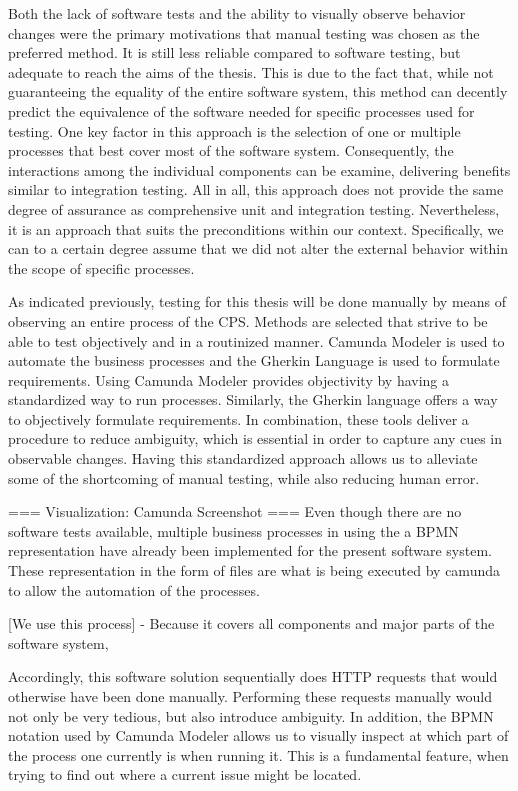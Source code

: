 Both the lack of software tests and the ability to visually observe behavior changes were the primary motivations that manual testing was chosen as the preferred method. It is still less reliable compared to software testing, but adequate to reach the aims of the thesis. This is due to the fact that, while not guaranteeing the equality of the entire software system, this method can decently predict the equivalence of the software needed for specific processes used for testing. One key factor in this approach is the selection of one or multiple processes that best cover most of the software system. Consequently, the interactions among the individual components can be examine, delivering benefits similar to integration testing. All in all, this approach does not provide the same degree of assurance as comprehensive unit and integration testing. Nevertheless, it is an approach that suits the preconditions within our context. Specifically, we can to a certain degree assume that we did not alter the external behavior within the scope of specific processes. 


As indicated previously, testing for this thesis will be done manually by means of observing an entire process of the CPS. Methods are selected that strive to be able to test objectively and in a routinized manner. Camunda Modeler is used to automate the business processes and the Gherkin Language is used to formulate requirements. Using Camunda Modeler provides objectivity by having a standardized way to run processes. Similarly, the Gherkin language offers a way to objectively formulate requirements. In combination, these tools deliver a procedure to reduce ambiguity, which is essential in order to capture any cues in observable changes. Having this standardized approach allows us to alleviate some of the shortcoming of manual testing, while also reducing human error.

=== Visualization: Camunda Screenshot ===
Even though there are no software tests available, multiple business processes in using the a BPMN representation have already been implemented for the present software system. These representation in the form of files are what is being executed by camunda to allow the automation of the processes. 

[We use this process]
- Because it covers all components and major parts of the software system, 

Accordingly, this software solution sequentially does HTTP requests that would otherwise have been done manually. Performing these requests manually would not only be very tedious, but also introduce ambiguity. In addition, the BPMN notation used by Camunda Modeler allows us to visually inspect at which part of the process one currently is when running it. This is a fundamental feature, when trying to find out where a current issue might be located.


